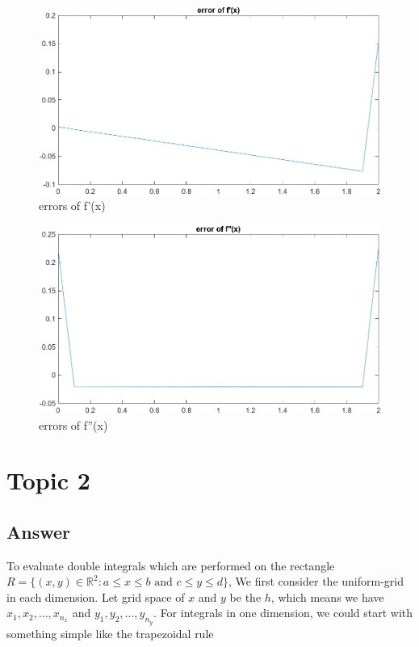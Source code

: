 \documentclass[
	12pt, %
]{fphw}
\numberwithin{equation}{section}
\numberwithin{figure}{section}
\numberwithin{table}{section}
\begin{document}
\begin{figure}[h!]
	\centering
	\includegraphics[width=0.8\columnwidth]{img/error_f'(x).png} 
	\caption{errors of f'(x)}
	\label{fig:error_f'(x)}
\end{figure}

\begin{figure}[h!]
	\centering
	\includegraphics[width=0.8\columnwidth]{img/error_f''(x).png} 
	\caption{errors of f''(x)}
	\label{fig:error_f''(x)}
\end{figure}


\section{Topic 2}

\subsection*{Answer}

To evaluate double integrals which are performed on the rectangle $R = \{ (x, y) \in \mathbb{R}^2: a \leq x \leq b \text{ and } c \leq y \leq d  \} $, We first consider the uniform-grid in each
dimension. Let grid space of $x$ and $y$ be the $h$, which means we have $x_1, x_2, \ldots , x_{n_x}$ and $y_1, y_2, \ldots , y_{n_y}$.\cite{numinteg} \cite{nume}
For integrals in one dimension, we could start with something simple like the trapezoidal rule
\end{document}
